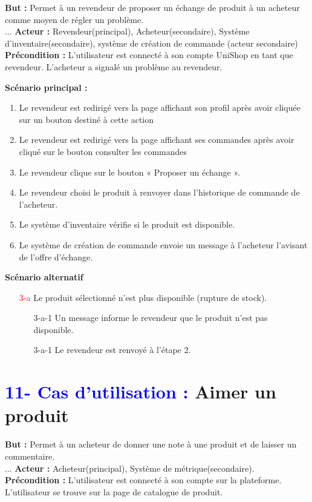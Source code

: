 \documentclass[16pt]{report}
\begin{document}
\textbf{But :} Permet à un revendeur de proposer un échange de produit à un acheteur comme moyen de régler un problème. \\
... %
\textbf{Acteur :} Revendeur(principal), Acheteur(secondaire), Système d’inventaire(secondaire), système de création de commande (acteur secondaire)\\  
\textbf{Précondition :} L’utilisateur est connecté à son compte UniShop en tant que revendeur. L’acheteur a signalé un problème au revendeur.

\textbf{Scénario principal :}
\begin{enumerate}[leftmargin=4em]
    \item Le revendeur est redirigé vers la page affichant son profil après avoir cliquée sur un bouton destiné à cette action
    \item Le revendeur est redirigé vers la page affichant ses commandes après avoir cliqué sur le bouton consulter les commandes
    \item Le revendeur clique sur le bouton « Proposer un échange ».
    \item Le revendeur choisi le produit à renvoyer dans l’historique de commande de l’acheteur.
    \item Le système d’inventaire vérifie si le produit est disponible.
    \item Le système de création de commande envoie un message à l’acheteur l’avisant de l’offre d’échange.
\end{enumerate}

\textbf{Scénario alternatif}
\begin{enumerate}
    \item[\textcolor{red}{3-a}] Le produit sélectionné n’est plus disponible (rupture de stock). 
        \begin{enumerate}
            \item[3-a-1] Un message informe le revendeur que le produit n’est pas disponible.
            \item[3-a-1] Le revendeur est renvoyé à l’étape 2.
        \end{enumerate}
\end{enumerate}



\section*{\textbf{\textcolor{blue}{11- Cas d'utilisation :}} Aimer un produit}
\textbf{But :} Permet à un acheteur de donner une note à une produit et de laisser un commentaire.\\
... %
\textbf{Acteur :} Acheteur(principal), Système de métrique(secondaire). \\ 
\textbf{Précondition :} L’utilisateur est connecté à son compte sur la plateforme. L’utilisateur se trouve sur la page de catalogue de produit. 
\end{document}
